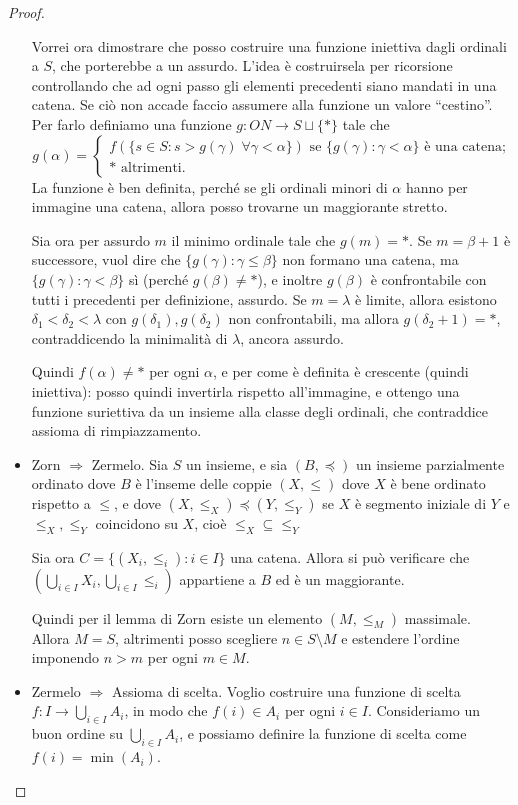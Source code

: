 \documentclass[a4paper,10pt,oneside]{article}
\newcommand{\trash}{*}
\theoremstyle{plain}
\theoremstyle{definition}
\theoremstyle{remark}
\begin{document}
\begin{proof}
\begin{itemize}
 Vorrei ora dimostrare che posso costruire una funzione iniettiva dagli ordinali a $S$, che porterebbe a un assurdo. L'idea è costruirsela per ricorsione controllando che ad ogni passo gli elementi precedenti siano mandati in una catena. Se ciò non accade faccio assumere alla funzione un valore ``cestino''.
 Per farlo definiamo una funzione $g: ON \rightarrow S \sqcup \{\trash\}$ tale che
 \[g(\alpha)=\left\{
 \begin{array}{l}
 f(\{s\in S:s>g(\gamma)\; \forall \gamma < \alpha\}) \textrm{ se } \{g(\gamma): \gamma < \alpha\} \textrm{ è una catena;}\\
 \trash \textrm{ altrimenti.}
 \end{array}
 \right.	
 \]
 La funzione è ben definita, perché se gli ordinali minori di $\alpha$ hanno per immagine una catena, allora posso trovarne un maggiorante stretto.
	
 Sia ora per assurdo $m$ il minimo ordinale tale che $g(m)=\trash$. Se $m=\beta+1$ è successore, vuol dire che $\{g(\gamma):\gamma\le\beta\}$ non formano una catena, ma $\{g(\gamma):\gamma<\beta\}$ sì (perché $g(\beta)\ne \trash$), e inoltre $g(\beta)$ è confrontabile con tutti i precedenti per definizione, assurdo. Se $m=\lambda$ è limite, allora esistono $\delta_1<\delta_2<\lambda$ con $g(\delta_1),g(\delta_2)$ non confrontabili, ma allora $g(\delta_2+1)=\trash$, contraddicendo la minimalità di $\lambda$, ancora assurdo.

 Quindi $f(\alpha)\ne\trash$ per ogni $\alpha$, e per come è definita è crescente (quindi iniettiva): posso quindi invertirla rispetto all'immagine, e ottengo una funzione suriettiva da un insieme alla classe degli ordinali, che contraddice assioma di rimpiazzamento.

 \item Zorn $\Rightarrow$ Zermelo. Sia $S$ un insieme, e sia $(B,\preceq)$ un insieme parzialmente ordinato dove $B$ è l'inseme delle coppie $(X,\le)$ dove $X$ è bene ordinato rispetto a $\le$, e dove $(X, \le_X) \preceq (Y,\le_Y)$ se $X$ è segmento iniziale di $Y$ e $\le_X, \le_Y$ coincidono su $X$, cioè $\le_X \subseteq \le_Y$
 
 Sia ora $C=\{(X_i,\le_i):i\in I\}$ una catena. Allora si può verificare che $(\bigcup_{i\in I}X_i,\bigcup_{i\in I}\le_i)$ appartiene a $B$ ed è un maggiorante.
 
 Quindi per il lemma di Zorn esiste un elemento $(M,\le_M)$ massimale. Allora $M=S$, altrimenti posso scegliere $n\in S\setminus M$ e estendere l'ordine imponendo $n>m$ per ogni $m\in M$.
 
 \item Zermelo $\Rightarrow$ Assioma di scelta. Voglio costruire una funzione di scelta $f: I  \rightarrow \bigcup_{i\in I}A_i$, in modo che $f(i)\in A_i$ per ogni $i\in I$. Consideriamo un buon ordine su $\bigcup_{i\in I}A_i$, e possiamo definire la funzione di scelta come $f(i)=\min(A_i)$.

\end{itemize}
\end{proof}
\end{document}
